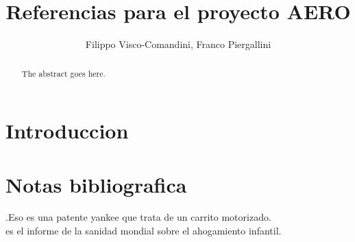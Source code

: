 \documentclass[draft]{IEEEtran}
\begin{document}
\title{Referencias para el proyecto AERO}

\author{Filippo Visco-Comandini, Franco Piergallini}%



\maketitle

\begin{abstract}
The abstract goes here.
\end{abstract}
\section{Introduccion}
 \cite{nahmias2004models}

\section{Notas bibliografica}

\cite{voeks1970self}.Eso es una patente yankee que trata de un carrito motorizado.\\
\cite{OMS2018} es el informe de la sanidad mondial sobre el ahogamiento infantil.







\end{document}
